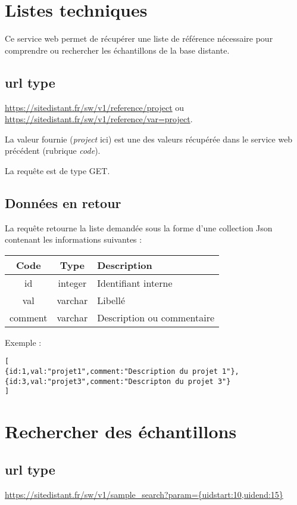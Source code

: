 \section{Listes techniques}
\label{listes}

Ce service web permet de récupérer une liste de référence nécessaire pour comprendre ou rechercher les échantillons de la base distante.

\subsection{url type}
\url{https://sitedistant.fr/sw/v1/reference/project} ou 
\url{https://sitedistant.fr/sw/v1/reference/var=project}.

La valeur fournie (\textit{project} ici) est une des valeurs récupérée dans le service web précédent (rubrique \textit{code}).

La requête est de type GET. 


\subsection{Données en retour}
La requête retourne la liste demandée sous la forme d'une collection Json contenant les informations suivantes :

\begin{longtable}{|c|c|>{\raggedright\arraybackslash}p{10cm}|}
\hline 
Code & Type & Description \\ 
\hline
id & integer & Identifiant interne\\
\hline
val & varchar & Libellé\\
\hline
comment & varchar & Description ou commentaire\\
\hline \endhead
\end{longtable}

Exemple :
\begin{lstlisting}
[
{id:1,val:"projet1",comment:"Description du projet 1"},
{id:3,val:"projet3",comment:"Descripton du projet 3"}
]
\end{lstlisting}


\section{Rechercher des échantillons}
\label{sampleSearch}
\subsection{url type}
\url{https://sitedistant.fr/sw/v1/sample_search?param={uidstart:10,uidend:15}}

